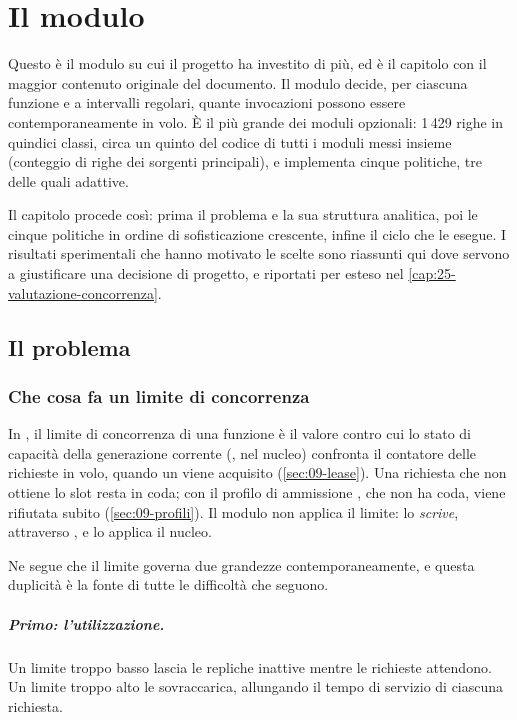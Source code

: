 \chapter{Il modulo }
\label{cap:12-concurrency-control}

Questo \`e il modulo su cui il progetto ha investito di pi\`u, ed \`e il capitolo
con il maggior contenuto originale del documento. Il modulo decide, per ciascuna
funzione e a intervalli regolari, quante invocazioni possono essere
contemporaneamente in volo. \`E il pi\`u grande dei moduli opzionali: 1\,429 righe
in quindici classi, circa un quinto del codice di tutti i moduli messi insieme
(conteggio di righe dei sorgenti principali), e implementa cinque politiche, tre
delle quali adattive.

Il capitolo procede cos\`i: prima il problema e la sua struttura analitica, poi
le cinque politiche in ordine di sofisticazione crescente, infine il ciclo che
le esegue. I risultati sperimentali che hanno motivato le scelte sono riassunti
qui dove servono a giustificare una decisione di progetto, e riportati per esteso
nel \cref{cap:25-valutazione-concorrenza}.

\section{Il problema}

\subsection{Che cosa fa un limite di concorrenza}

In \nf{}, il limite di concorrenza di una funzione \`e il valore contro cui lo
stato di capacit\`a della generazione corrente (,
nel nucleo) confronta il contatore delle richieste in volo, quando un
 viene acquisito (\cref{sec:09-lease}). Una richiesta che non
ottiene lo slot resta in coda; con il profilo di ammissione , che non
ha coda, viene rifiutata subito (\cref{sec:09-profili}). Il modulo
 non applica il limite: lo \emph{scrive}, attraverso
, e lo applica il nucleo.

Ne segue che il limite governa due grandezze contemporaneamente, e questa
duplicit\`a \`e la fonte di tutte le difficolt\`a che seguono.

\paragraph{Primo: l'utilizzazione.} Un limite troppo basso lascia le repliche
inattive mentre le richieste attendono. Un limite troppo alto le sovraccarica,
allungando il tempo di servizio di ciascuna richiesta.

